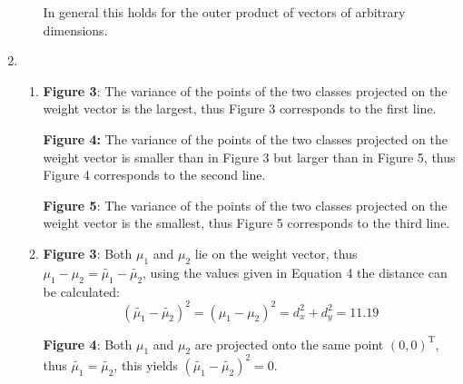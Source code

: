 \documentclass[DIN, pagenumber=false, fontsize=11pt, parskip=half]{scrartcl}
\begin{document}
\begin{enumerate}
\begin{enumerate}[label=\alph*)]
\begin{equation*}
                    \end{equation*}
                    In general this holds for the outer product of vectors of arbitrary dimensions.
            \end{enumerate}
        \item
            \begin{enumerate}[label=\alph*)]
                \item 
                    \textbf{Figure 3}: The variance of the points of the two classes projected on the weight vector is the largest, thus Figure 3 corresponds to the first line.
                    
                    \textbf{Figure 4:} The variance of the points of the two classes projected on the weight vector is smaller than in Figure 3 but larger than in Figure 5, thus Figure 4 corresponds to the second line.

                    \textbf{Figure 5}: The variance of the points of the two classes projected on the weight vector is the smallest, thus Figure 5 corresponds to the third line.
                \item 
                    \textbf{Figure 3}: Both $\mu_1$ and $\mu_2$ lie on the weight vector, thus $\mu_1 - \mu_2 = \tilde{\mu_1} - \tilde{\mu_2}$, using the values given in Equation 4 the distance can be calculated:
                    \begin{equation*}
                        {(\tilde{\mu_1} - \tilde{\mu_2})}^2
                            = {(\mu_1 - \mu_2)}^2
                            = d_x^2 + d_y^2
                            = 11.19
                    \end{equation*}

                    \textbf{Figure 4}: Both $\mu_1$ and $\mu_2$ are projected onto the same point ${(0,0)}^\text{T}$, thus $\tilde{\mu_1} = \tilde{\mu_2}$, this yields ${(\tilde{\mu_1} - \tilde{\mu_2})}^2 = 0$.


\end{enumerate}
\end{enumerate}
\end{document}
